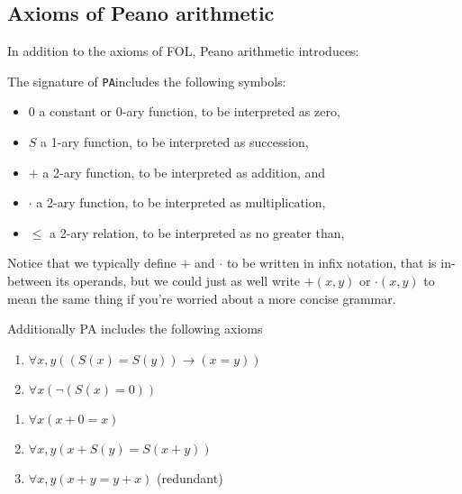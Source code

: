 \documentclass[10pt]{article}
\newcommand{\PA}{\texttt{PA}}
\begin{document}
	\subsection{Axioms of Peano arithmetic}
	In addition to the axioms of FOL, Peano arithmetic introduces:
	
	The signature of \PA includes the following symbols:
	\begin{itemize}
		\item $0$ a constant or 0-ary function, to be interpreted as zero,
		\item $S$ a 1-ary function, to be interpreted as succession,
		\item $+$ a 2-ary function, to be interpreted as addition, and
		\item $\cdot$ a 2-ary function, to be interpreted as multiplication,
		\item $\le$ a 2-ary relation, to be interpreted as no greater than,
	\end{itemize}
	
	Notice that we typically define $+$ and $\cdot$ to be written in infix notation, that is in-between its operands, but we could just as well write $+(x, y)$ or $\cdot(x, y)$ to mean the same thing if you're worried about a more concise grammar.
	
	Additionally PA includes the following axioms
	
	\begin{tcolorbox}[colback=green!5!white,colframe=green!75!black,title={\bf Successor axioms}]
		\begin{enumerate}[label=S.\arabic*]
			\item $\forall x, y ((S(x)=S(y)) \to (x=y))$ \label{ax:succ-inj}
			\item $\forall x (\lnot (S(x)=0))$ \label{ax:succ-first}
		\end{enumerate}
	\end{tcolorbox}
	
	\begin{tcolorbox}[colback=green!5!white,colframe=green!75!black,title={\bf Addition axioms}]
		\begin{enumerate}[label=A.\arabic*]
			\item $\forall x (x+0 = x)$ \label{ax:add-id}
			\item $\forall x, y (x+S(y) = S(x+y))$ \label{ax:add-succ}
			\item $\forall x, y (x+y=y+x)$ (redundant) \label{ax:add-sym}
		\end{enumerate}
	\end{tcolorbox}
	
\end{document}
